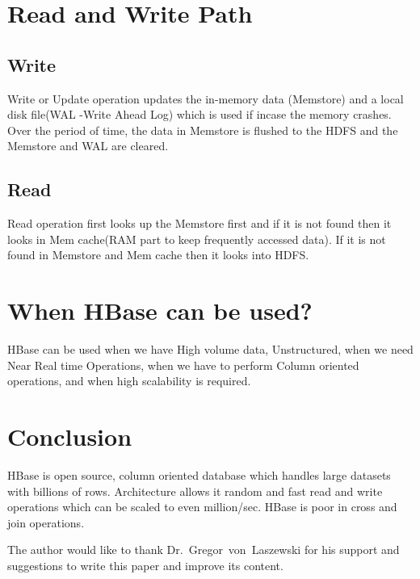 \section{Read and Write Path} 

\subsection{Write} Write or Update operation updates the in-memory data
(Memstore) and a local disk file(WAL -Write Ahead Log) which is used if incase
the memory crashes. Over the period of time, the data in Memstore is flushed to
the HDFS and the Memstore and WAL are cleared.

\subsection{Read} Read operation first looks up the Memstore first and if it is
not found then it looks in Mem cache(RAM part to keep frequently accessed data).
If it is not found in Memstore and Mem cache then it looks into HDFS.

\section{When HBase can be used?} HBase can be used when we have High volume
data, Unstructured, when we need Near Real time Operations, when we have to
perform Column oriented operations, and when high scalability is required.


\section{Conclusion} HBase is open source, column oriented database which
handles large datasets with billions of rows. Architecture allows it random and
fast read and write operations which can be scaled to even million/sec. HBase is
poor in cross and join operations.

\begin{acks}

The author would like to thank Dr.~Gregor~von~Laszewski for his support and
suggestions to write this paper and improve its content.

\end{acks}



 


